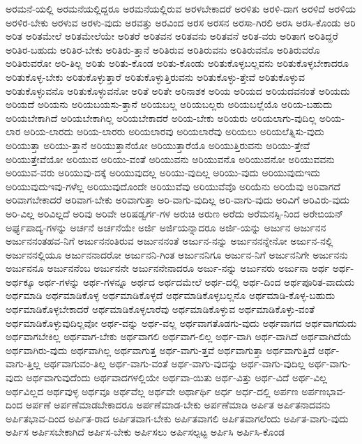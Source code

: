 {ಅರಮನೆ-ಯಲ್ಲಿ
ಅರಮನೆಯಲ್ಲಿದ್ದರೂ
ಅರಮನೆಯಲ್ಲಿರುವ
ಅರಳಬೇಕಾದರೆ
ಅರಳಿತು
ಅರಳಿ-ದಾಗ
ಅರಳಿದೆ
ಅರಳಿಯ
ಅರಳಿರ-ಬೇಕು
ಅರಳುವ
ಅರಳು-ವುದು
ಅರವತ್ತು
ಅರವಿಂದ
ಅರಸ
ಅರಸನ
ಅರಸಾ-ಗಿರಲಿ
ಅರಸಿ
ಅರಸಿ-ಕೊಂಡು
ಅರಿ
ಅರಿತ
ಅರಿತಮೇಲೆ
ಅರಿತಮೇಲೆಯೇ
ಅರಿತರೆ
ಅರಿತವನ
ಅರಿತವನು
ಅರಿತವನೆ
ಅರಿತ-ವರು
ಅರಿತಾಗ
ಅರಿತಿದ್ದರೆ
ಅರಿತಿರ-ಬಹುದು
ಅರಿತಿರ-ಬೇಕು
ಅರಿತಿರು-ತ್ತಾನೆ
ಅರಿತಿರುವ
ಅರಿತಿರುವನು
ಅರಿತಿರುವನೊ
ಅರಿತಿರುವರೊ
ಅರಿತಿರುವರೋ
ಅರಿ-ತಿಲ್ಲ
ಅರಿತು
ಅರಿತು-ಕೊಂಡ
ಅರಿತು-ಕೊಂಡು
ಅರಿತುಕೊಳ್ಳಬಲ್ಲವನು
ಅರಿತುಕೊಳ್ಳಬೇಕಾದರೂ
ಅರಿತುಕೊಳ್ಳ-ಬೇಕು
ಅರಿತುಕೊಳ್ಳುತ್ತಾರೆ
ಅರಿತುಕೊಳ್ಳುತ್ತಿರುವನು
ಅರಿತುಕೊಳ್ಳು-ತ್ತೇವೆ
ಅರಿತುಕೊಳ್ಳುವ
ಅರಿತುಕೊಳ್ಳುವನೊ
ಅರಿತುಕೊಳ್ಳುವನೋ
ಅರಿತೆ
ಅರಿತೇ
ಅರಿನಾಶಕ
ಅರಿಯ
ಅರಿಯದ
ಅರಿಯದವನಂತೆ
ಅರಿಯದು
ಅರಿಯದೆ
ಅರಿಯನು
ಅರಿಯಬಯಸು-ತ್ತಾನೆ
ಅರಿಯಬಲ್ಲ
ಅರಿಯಬಲ್ಲರು
ಅರಿಯಬಲ್ಲೆಯೊ
ಅರಿಯ-ಬಹುದು
ಅರಿಯಬೇಕಾಗಿದೆ
ಅರಿಯಬೇಕಾಗಿಲ್ಲ
ಅರಿಯಬೇಕಾದರೆ
ಅರಿಯ-ಬೇಕು
ಅರಿಯರು
ಅರಿಯಲಾಗು-ವುದಿಲ್ಲ
ಅರಿಯ-ಲಾರ
ಅರಿಯ-ಲಾರದು
ಅರಿಯ-ಲಾರರು
ಅರಿಯಲಾರವು
ಅರಿಯಲಾರೆವು
ಅರಿಯಲು
ಅರಿಯಲೆತ್ನಿಸು-ವುದು
ಅರಿಯುತ್ತಾ
ಅರಿಯು-ತ್ತಾನೆ
ಅರಿಯುತ್ತಾನೆಯೋ
ಅರಿಯುತ್ತಾರೆಯೊ
ಅರಿಯುತ್ತಿರುವನು
ಅರಿಯು-ತ್ತೇವೆ
ಅರಿಯುತ್ತೇವೆಯೋ
ಅರಿಯುವ
ಅರಿಯು-ವಂತೆ
ಅರಿಯುವನು
ಅರಿಯುವನೊ
ಅರಿಯುವನೋ
ಅರಿಯುವವನು
ಅರಿಯುವ-ವರು
ಅರಿಯುವು-ದಕ್ಕೆ
ಅರಿಯುವುದಲ್ಲ
ಅರಿಯು-ವುದಿಲ್ಲ
ಅರಿಯು-ವುದು
ಅರಿಯುವುದುಇದು
ಅರಿಯುವುದುಇವು-ಗಳೆಲ್ಲ
ಅರಿಯುವುದೊಂದೇ
ಅರಿಯುವೆವು
ಅರಿಯುವೆವೊ
ಅರಿಯೆನು
ಅರಿಯೆವು
ಅರಿವಾಗದೆ
ಅರಿವಾಗಬೇಕಾದರೆ
ಅರಿವಾಗ-ಬೇಕು
ಅರಿವಾಗುತ್ತಾ
ಅರಿ-ವಾಗು-ವುದಿಲ್ಲ
ಅರಿ-ವಾಗು-ವುದು
ಅರಿವಿಗೆ
ಅರಿವಿರು-ವುದು
ಅರಿ-ವಿಲ್ಲ
ಅರಿವಿಲ್ಲದೆ
ಅರಿವು
ಅರಿವೇ
ಅರಿಷಡ್ವರ್ಗ-ಗಳ
ಅರುಚಿ
ಅರುಣ
ಅರೆದು
ಅರೆಮನಸ್ಸಿ-ನಿಂದ
ಅರೇಬಿಯನ್
ಅರ್ಘ್ಯಪಾದ್ಯ-ಗಳನ್ನು
ಅರ್ಚನೆ
ಅರ್ಚನೆಯೇ
ಅರ್ಜಿ
ಅರ್ಜಿಯನ್ನಾದರೂ
ಅರ್ಜಿ-ಯನ್ನು
ಅರ್ಜುನ
ಅರ್ಜುನನ
ಅರ್ಜುನನಂತಹವ-ನಿಗೆ
ಅರ್ಜುನನಂತಿರುವ
ಅರ್ಜುನನಂತೆ
ಅರ್ಜುನ-ನನ್ನು
ಅರ್ಜುನನನ್ನೇನೋ
ಅರ್ಜುನ-ನಲ್ಲಿ
ಅರ್ಜುನನಲ್ಲಿಯೂ
ಅರ್ಜುನನಾದರೋ
ಅರ್ಜುನನಿ-ಗಿಂತ
ಅರ್ಜುನನಿಗೂ
ಅರ್ಜುನ-ನಿಗೆ
ಅರ್ಜುನನಿಗೇ
ಅರ್ಜುನನು
ಅರ್ಜುನನೂ
ಅರ್ಜುನನೆಂಬ
ಅರ್ಜುನನೇ
ಅರ್ಜುನನೇನಾದರೂ
ಅರ್ಜು-ನನ್ನು
ಅರ್ಜುನರು
ಅರ್ಜುನಾ
ಅರ್ಥ
ಅರ್ಥ-
ಅರ್ಥಕ್ಕೂ
ಅರ್ಥ-ಗಳನ್ನು
ಅರ್ಥ-ಗಳನ್ನೂ
ಅರ್ಥದ
ಅರ್ಥದಮೇಲೆ
ಅರ್ಥ-ದಲ್ಲಿ
ಅರ್ಥ-ದಿಂದ
ಅರ್ಥಪೂರಿತ-ವಾದುದು
ಅರ್ಥಮಾಡಿ
ಅರ್ಥಮಾಡಿಕೊಳ್ಳ
ಅರ್ಥಮಾಡಿಕೊಳ್ಳದೆ
ಅರ್ಥಮಾಡಿಕೊಳ್ಳಬಲ್ಲನೊ
ಅರ್ಥಮಾಡಿ-ಕೊಳ್ಳ-ಬಹುದು
ಅರ್ಥಮಾಡಿಕೊಳ್ಳಬೇಕಾದರೆ
ಅರ್ಥಮಾಡಿಕೊಳ್ಳಲಾರೆವು
ಅರ್ಥಮಾಡಿಕೊಳ್ಳುವ
ಅರ್ಥಮಾಡಿಕೊಳ್ಳು-ವಂತೆ
ಅರ್ಥಮಾಡಿಕೊಳ್ಳುವುದಿಲ್ಲವೋ
ಅರ್ಥ-ವನ್ನು
ಅರ್ಥ-ವಲ್ಲ
ಅರ್ಥವಾಗತೊಡಗು-ವುದು
ಅರ್ಥವಾಗದ
ಅರ್ಥವಾಗದುದು
ಅರ್ಥವಾಗಬೇಕಿಲ್ಲ
ಅರ್ಥವಾಗ-ಬೇಕು
ಅರ್ಥವಾಗಲಿ
ಅರ್ಥವಾಗ-ಲಿಲ್ಲ
ಅರ್ಥ-ವಾಗಿ
ಅರ್ಥ-ವಾಗಿದೆ
ಅರ್ಥವಾಗಿದೆಯೆ
ಅರ್ಥವಾಗಿರು-ವುದು
ಅರ್ಥವಾಗಿಲ್ಲ
ಅರ್ಥವಾಗುತ್ತ
ಅರ್ಥ-ವಾಗು-ತ್ತವೆ
ಅರ್ಥವಾಗುತ್ತಾ
ಅರ್ಥವಾಗುತ್ತಿದೆ
ಅರ್ಥ-ವಾಗು-ತ್ತಿಲ್ಲ
ಅರ್ಥವಾಗುವಂ-ತಿಲ್ಲ
ಅರ್ಥ-ವಾಗು-ವಂತೆ
ಅರ್ಥ-ವಾಗು-ವುದನ್ನು
ಅರ್ಥ-ವಾಗು-ವುದಿಲ್ಲ
ಅರ್ಥ-ವಾಗು-ವುದು
ಅರ್ಥವಾಗುವುದೆಂದು
ಅರ್ಥವಾದಗಳಲ್ಲಿಯೇ
ಅರ್ಥವಾ-ಯಿತು
ಅರ್ಥ-ವಿತ್ತು
ಅರ್ಥ-ವಿದೆ
ಅರ್ಥ-ವಿಲ್ಲ
ಅರ್ಥವಿಲ್ಲದ
ಅರ್ಥವುಳ್ಳ
ಅರ್ಥವೂ
ಅರ್ಥವೆಲ್ಲ
ಅರ್ಥವೇ
ಅರ್ಥಾರ್ಥಿ
ಅರ್ಧ
ಅರ್ಧ-ದಲ್ಲಿ
ಅರ್ಪಣ
ಅರ್ಪಣಭಾವ-ದಿಂದ
ಅರ್ಪಣೆ
ಅರ್ಪಣೆಮಾಡಬೇಕಾದರೂ
ಅರ್ಪಣೆಮಾಡ-ಬೇಕು
ಅರ್ಪಣೆಮಾಡಿ
ಅರ್ಪಿತ
ಅರ್ಪಿತನಾದವನು
ಅರ್ಪಿತಭಾವ-ದಿಂದ
ಅರ್ಪಿತ-ರಾದ
ಅರ್ಪಿತವಾಗ-ಬೇಕು
ಅರ್ಪಿತವಾಗಲಿ
ಅರ್ಪಿತವಾಗಲೆಂದು
ಅರ್ಪಿತ-ವಾಗು-ವುದು
ಅರ್ಪಿಸ
ಅರ್ಪಿಸಬೇಕಾಗಿದೆ
ಅರ್ಪಿಸ-ಬೇಕು
ಅರ್ಪಿಸಲು
ಅರ್ಪಿಸಲ್ಪಟ್ಟ
ಅರ್ಪಿಸಿ
ಅರ್ಪಿಸಿ-ಕೊಂಡ
}
